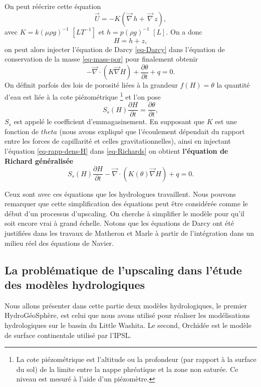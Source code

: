 \documentclass[a4paper,11pt]{article}
\numberwithin{equation}{section}
\begin{document}
On peut réécrire cette équation
\[\overrightarrow{U}=-K(\overrightarrow{\nabla}\, h + \,\overrightarrow{\nabla}\, z),\]
avec $K=k(\mu \rho g)^{-1}$ $[LT^{-1}]$ et $h=p(\rho g)^{-1}$ $[L]$. On a donc 
\[H=h+z,\]
on peut alors injecter l'équation de Darcy \eqref{eq-Darcy} dans l'équation de conservation de la masse \eqref{eq-mass-por} pour finalement obtenir
\begin{equation}
	\label{eq-Richards}
 	-\overrightarrow{\nabla} \cdot (K\overrightarrow{\nabla}H)+\frac{\partial\theta}{\partial t}+ q=0.
\end{equation}  
On définit parfois des lois de porosité liées à la grandeur $f(H)=\theta$ la quantité d'eau est liée à la cote piézométrique \footnote{La cote piézométrique est l'altitude ou la profondeur (par rapport à la surface du sol) de la limite entre la nappe phréatique et la zone non saturée. Ce niveau est mesuré à l'aide d'un piézomètre.} et l'on pose 
\begin{equation}
	\label{eq-rapp-dens-H}
	S_s(H)\frac{\partial H}{\partial t}=\frac{\partial\theta}{\partial t},
\end{equation}
$S_s$ est appelé le coefficient d'emmagasinement. En supposant que $K$ est une fonction de $theta$ (nous avons expliqué que l'écoulement dépendait du rapport entre les forces de capillarité et celles gravitationnelles), ainsi en injectant l'équation \eqref{eq-rapp-dens-H} dans \eqref{eq-Richards} on obtient  \textbf{l'équation de Richard généralisée}
\begin{equation}
	\label{eq-ge-richard}
	S_s(H)\frac{\partial H}{\partial t}-\overrightarrow{\nabla} \cdot (K(\theta)\overrightarrow{\nabla}H)+q=0.
\end{equation}

Ceux sont avec ces équations que les hydrologues travaillent. Nous pouvons remarquer que cette simplification des équations peut être considérée comme le début d'un processus d'upscaling. On cherche à simplifier le modèle pour qu'il soit encore vrai à grand échelle. Notons que les équations de Darcy ont été justifiées dans les travaux de Matheron et Marle à partir de l'intégration dans un milieu réel des équations de Navier. 

\subsection{La problématique de l'upscaling dans l'étude des modèles hydrologiques}
\label{ch:modeles-hydro-upscaling}
Nous allons présenter dans cette partie deux modèles hydrologiques, le premier HydroGéoSphère, est celui que nous avons utilisé pour réaliser les modélisations hydrologiques sur le bassin du Little Washita. Le second, Orchidée est le modèle de surface continentale utilisé par l'IPSL. 
\end{document}
